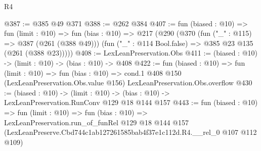 \begin{lexlean}{R4}
\begin{coremodule}
@387 := @385 @49 @371
@388 := @262 @384
@407 := fun (biased : @10) =>
  fun (limit : @10) =>
  fun (bias : @10) =>
  @217
    (@290
      (@370
        (fun ("_" : @115) => @387 (@261 (@388 @49)))
        (fun ("_" : @114 Bool.false) => @385 @23 @135 (@261 (@388 @23)))))
@408 := LexLeanPreservation.Obs
@411 := (biased : @10) -> (limit : @10) -> (bias : @10) -> @408
@422 := fun (biased : @10) =>
  fun (limit : @10) =>
  fun (bias : @10) =>
  cond.{1} @408 @150 (LexLeanPreservation.Obs.value @156) LexLeanPreservation.Obs.overflow
@430 := (biased : @10) ->
  (limit : @10) -> (bias : @10) -> LexLeanPreservation.RunConv @129 @18 @144 @157
@443 := fun (biased : @10) =>
  fun (limit : @10) =>
  fun (bias : @10) =>
  LexLeanPreservation.run_of_funRel
    @129
    @18
    @144
    @157
    (LexLeanPreserve.Cbd744c1ab127261585bab4f37e1c112d.R4.__rel_0 @107 @112 @109)
\end{coremodule}
\end{lexlean}
